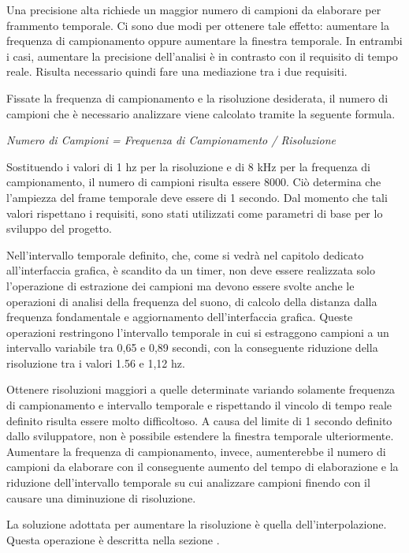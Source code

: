 Una precisione alta richiede un maggior numero di campioni da elaborare per frammento temporale. 
Ci sono due modi per ottenere tale effetto: aumentare la frequenza di campionamento oppure aumentare la finestra temporale.
In entrambi i casi, aumentare la precisione dell'analisi è in contrasto con il requisito di tempo reale.
Risulta necessario quindi fare una mediazione tra i due requisiti.

Fissate la frequenza di campionamento e la risoluzione desiderata, il numero di campioni che è necessario analizzare viene calcolato tramite la seguente formula.

\vspace{0.2cm}
\centerline{\textit{Numero di Campioni = Frequenza di Campionamento / Risoluzione}}
\vspace{0.2cm}

Sostituendo i valori di 1 hz per la risoluzione e di 8 kHz per la frequenza di campionamento, il numero di campioni risulta essere 8000. 
Ciò determina che l'ampiezza del frame temporale deve essere di 1 secondo.
Dal momento che tali valori rispettano i requisiti, sono stati utilizzati come parametri di base per lo sviluppo del progetto.

Nell'intervallo temporale definito, che, come si vedrà nel capitolo dedicato all'interfaccia grafica, è scandito da un timer, non deve essere realizzata solo l'operazione di estrazione dei campioni ma devono essere svolte anche le operazioni di analisi della frequenza del suono, di calcolo della distanza dalla frequenza fondamentale e aggiornamento dell'interfaccia grafica. 
Queste operazioni restringono l'intervallo temporale in cui si estraggono campioni a un intervallo variabile tra 0,65 e 0,89 secondi, con la conseguente riduzione della risoluzione tra i valori 1.56 e 1,12 hz.

Ottenere risoluzioni maggiori a quelle determinate variando solamente frequenza di campionamento e intervallo temporale e rispettando il vincolo di tempo reale definito risulta essere molto difficoltoso. 
A causa del limite di 1 secondo definito dallo sviluppatore, non è possibile estendere la finestra temporale ulteriormente.
Aumentare la frequenza di campionamento, invece, aumenterebbe il numero di campioni da elaborare con il conseguente aumento del tempo di elaborazione e la riduzione dell'intervallo temporale su cui analizzare campioni finendo con il causare una diminuzione di risoluzione.

La soluzione adottata per aumentare la risoluzione è quella dell'interpolazione.
Questa operazione è descritta nella sezione .

